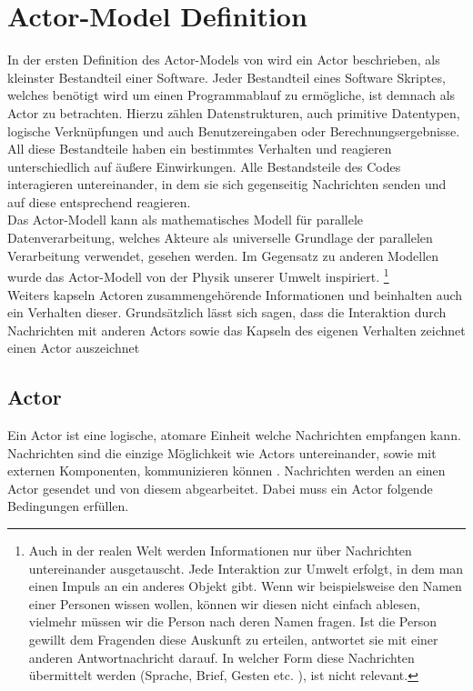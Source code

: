 \section{Actor-Model Definition}\label{actor:definition}
In der ersten Definition des Actor-Models von \citep{hewitt1973session} wird ein Actor beschrieben, als kleinster Bestandteil einer Software. Jeder Bestandteil eines Software Skriptes, welches benötigt wird um einen Programmablauf zu ermögliche, ist demnach als Actor zu betrachten. Hierzu zählen Datenstrukturen, auch primitive Datentypen, logische Verknüpfungen und auch Benutzereingaben oder Berechnungsergebnisse. All diese Bestandteile haben ein bestimmtes Verhalten und reagieren unterschiedlich auf äußere Einwirkungen. Alle Bestandsteile des Codes interagieren untereinander, in dem sie sich gegenseitig Nachrichten senden und auf diese entsprechend reagieren.\\
Das Actor-Modell kann als mathematisches Modell für parallele Datenverarbeitung, welches Akteure als universelle Grundlage der parallelen Verarbeitung verwendet, gesehen werden. Im Gegensatz zu anderen Modellen wurde das Actor-Modell von der Physik unserer Umwelt inspiriert. \footnote{Auch in der realen Welt werden Informationen nur über Nachrichten untereinander ausgetauscht. Jede Interaktion zur Umwelt erfolgt, in dem man einen Impuls an ein anderes Objekt gibt. Wenn wir beispielsweise den Namen einer Personen wissen wollen, können wir diesen nicht einfach ablesen, vielmehr müssen wir die Person nach deren Namen fragen. Ist die Person gewillt dem Fragenden diese Auskunft zu erteilen, antwortet sie mit einer anderen Antwortnachricht darauf. In welcher Form diese Nachrichten übermittelt werden (Sprache, Brief, Gesten etc. ), ist nicht relevant.} \citep{Vernon2015ReactiveAkka} \\ 
Weiters kapseln Actoren zusammengehörende Informationen und beinhalten auch ein Verhalten dieser.  Grundsätzlich lässt sich sagen, dass die Interaktion durch Nachrichten mit anderen Actors sowie das Kapseln des eigenen Verhalten zeichnet einen Actor auszeichnet

\subsection{Actor}
Ein Actor ist eine logische, atomare Einheit welche Nachrichten empfangen kann. Nachrichten sind die einzige Möglichkeit wie Actors untereinander, sowie mit externen Komponenten, kommunizieren können \citep{Agha1985ConcurrentParallelism}. Nachrichten werden an einen Actor gesendet und von diesem abgearbeitet. Dabei muss ein Actor folgende Bedingungen erfüllen.

